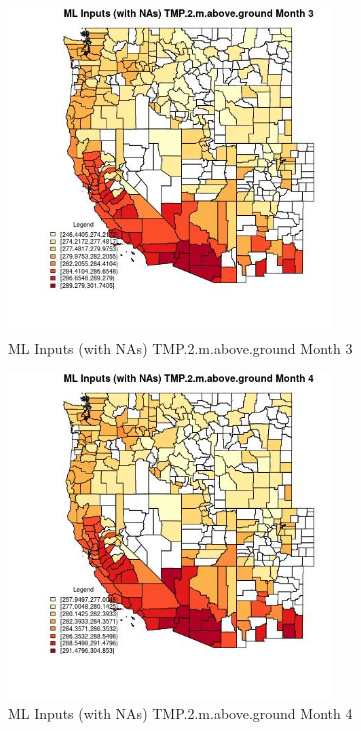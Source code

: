 \clearpage 

\begin{figure} 
\centering  
\includegraphics[width=0.77\textwidth]{Code_Outputs/Report_ML_input_PM25_Step4_part_e_de_duplicated_aves_compiled_2019-05-21wNAs_CountyTMP2mabovegroundmedianMonth3.jpg} 
\caption{\label{fig:Report_ML_input_PM25_Step4_part_e_de_duplicated_aves_compiled_2019-05-21wNAsCountyTMP2mabovegroundmedianMonth3}ML Inputs (with NAs) TMP.2.m.above.ground Month 3} 
\end{figure} 
 

\begin{figure} 
\centering  
\includegraphics[width=0.77\textwidth]{Code_Outputs/Report_ML_input_PM25_Step4_part_e_de_duplicated_aves_compiled_2019-05-21wNAs_CountyTMP2mabovegroundmedianMonth4.jpg} 
\caption{\label{fig:Report_ML_input_PM25_Step4_part_e_de_duplicated_aves_compiled_2019-05-21wNAsCountyTMP2mabovegroundmedianMonth4}ML Inputs (with NAs) TMP.2.m.above.ground Month 4} 
\end{figure} 
 

